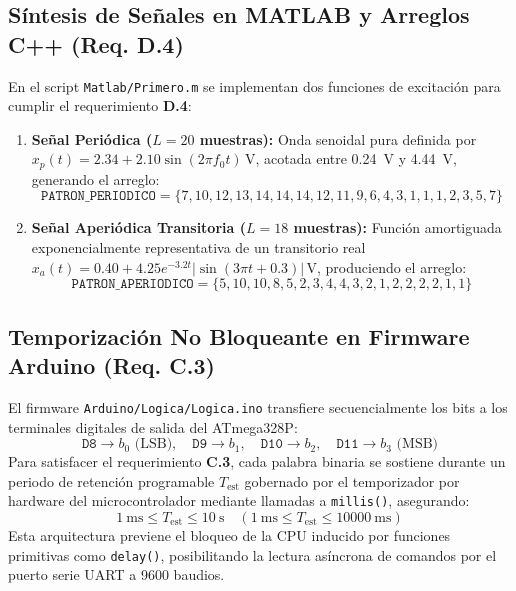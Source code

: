 \documentclass[11pt,letterpaper]{article}
\begin{document}
\subsection{Síntesis de Señales en MATLAB y Arreglos C++ (Req. D.4)}
En el script \texttt{Matlab/Primero.m} se implementan dos funciones de excitación para cumplir el requerimiento \textbf{D.4}:
\begin{enumerate}
    \item \textbf{Señal Periódica ($L = 20$ muestras):} Onda senoidal pura definida por $x_p(t) = 2.34 + 2.10\sin(2\pi f_0 t)\,\si{\volt}$, acotada entre \SI{0.24}{\volt} y \SI{4.44}{\volt}, generando el arreglo:
    \begin{equation*}
    \texttt{PATRON\_PERIODICO} = \{7, 10, 12, 13, 14, 14, 14, 12, 11, 9, 6, 4, 3, 1, 1, 1, 2, 3, 5, 7\}
    \end{equation*}
    \item \textbf{Señal Aperiódica Transitoria ($L = 18$ muestras):} Función amortiguada exponencialmente representativa de un transitorio real $x_a(t) = 0.40 + 4.25 e^{-3.2 t} |\sin(3\pi t + 0.3)|\,\si{\volt}$, produciendo el arreglo:
    \begin{equation*}
    \texttt{PATRON\_APERIODICO} = \{5, 10, 10, 8, 5, 2, 3, 4, 4, 3, 2, 1, 2, 2, 2, 2, 1, 1\}
    \end{equation*}
\end{enumerate}

\subsection{Temporización No Bloqueante en Firmware Arduino (Req. C.3)}
El firmware \texttt{Arduino/Logica/Logica.ino} transfiere secuencialmente los bits a los terminales digitales de salida del ATmega328P:
\begin{equation*}
\texttt{D8} \to b_0\text{ (LSB)}, \quad \texttt{D9} \to b_1, \quad \texttt{D10} \to b_2, \quad \texttt{D11} \to b_3\text{ (MSB)}
\end{equation*}
Para satisfacer el requerimiento \textbf{C.3}, cada palabra binaria se sostiene durante un periodo de retención programable $T_{\text{est}}$ gobernado por el temporizador por hardware del microcontrolador mediante llamadas a \texttt{millis()}, asegurando:
\begin{equation}
\SI{1}{\milli\second} \le T_{\text{est}} \le \SI{10}{\second} \quad (\SI{1}{\milli\second} \le T_{\text{est}} \le \SI{10000}{\milli\second})
\label{eq:test_req}
\end{equation}
Esta arquitectura previene el bloqueo de la CPU inducido por funciones primitivas como \texttt{delay()}, posibilitando la lectura asíncrona de comandos por el puerto serie UART a 9600 baudios.
\end{document}
